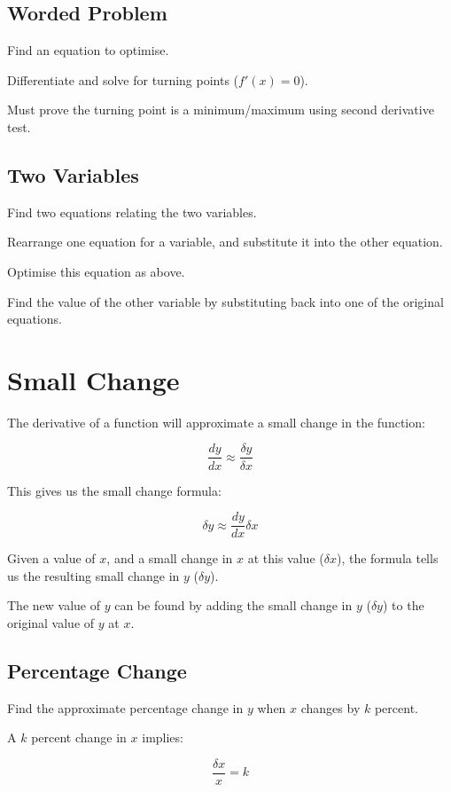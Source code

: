 \documentclass[a4paper,11pt]{article}
\begin{document}
\subsection{Worded Problem}

Find an equation to optimise.

Differentiate and solve for turning points ($f'(x) = 0$).

Must prove the turning point is a minimum/maximum using second derivative test.


\subsection{Two Variables}

Find two equations relating the two variables.

Rearrange one equation for a variable, and substitute it into the other
equation.

Optimise this equation as above.

Find the value of the other variable by substituting back into one of the
original equations.




\section{Small Change}

The derivative of a function will approximate a small change in the function:

$$
\frac{dy}{dx} \approx \frac{\delta y}{\delta x}
$$

This gives us the small change formula:

$$
\delta y \approx \frac{dy}{dx} \delta x
$$

Given a value of $x$, and a small change in $x$ at this value ($\delta x$), the
formula tells us the resulting small change in $y$ ($\delta y$).

The new value of $y$ can be found by adding the small change in $y$
($\delta y$) to the original value of $y$ at $x$.


\subsection{Percentage Change}

Find the approximate percentage change in $y$ when $x$ changes by $k$ percent.

A $k$ percent change in $x$ implies:

$$
\frac{\delta x}{x} = k
$$
\end{document}
